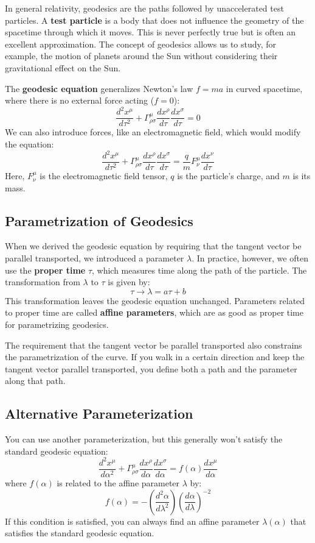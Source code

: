 \documentclass[11pt,letterpaper]{book}
\begin{document}
In general relativity, geodesics are the paths followed by unaccelerated test particles. A \textbf{test particle} is a body that does not influence the geometry of the spacetime through which it moves. This is never perfectly true but is often an excellent approximation. The concept of geodesics allows us to study, for example, the motion of planets around the Sun without considering their gravitational effect on the Sun.

The \textbf{geodesic equation} generalizes Newton's law \( f = ma \) in curved spacetime, where there is no external force acting (\( f = 0 \)):
\[
\frac{d^2 x^\mu}{d\tau^2} + \Gamma^\mu_{\rho\sigma} \frac{dx^\rho}{d\tau} \frac{dx^\sigma}{d\tau} = 0
\]
We can also introduce forces, like an electromagnetic field, which would modify the equation:
\[
\frac{d^2 x^\mu}{d\tau^2} + \Gamma^\mu_{\rho\sigma} \frac{dx^\rho}{d\tau} \frac{dx^\sigma}{d\tau} = \frac{q}{m} F^\mu_{\nu} \frac{dx^\nu}{d\tau}
\]
Here, \( F^\mu_{\nu} \) is the electromagnetic field tensor, \( q \) is the particle's charge, and \( m \) is its mass.

\subsection{Parametrization of Geodesics}

When we derived the geodesic equation by requiring that the tangent vector be parallel transported, we introduced a parameter \( \lambda \). In practice, however, we often use the \textbf{proper time} \( \tau \), which measures time along the path of the particle. The transformation from \( \lambda \) to \( \tau \) is given by:
\[
\tau \to \lambda = a\tau + b
\]
This transformation leaves the geodesic equation unchanged. Parameters related to proper time are called \textbf{affine parameters}, which are as good as proper time for parametrizing geodesics.

The requirement that the tangent vector be parallel transported also constrains the parametrization of the curve. If you walk in a certain direction and keep the tangent vector parallel transported, you define both a path and the parameter along that path.

\subsection{Alternative Parameterization}

You can use another parameterization, but this generally won’t satisfy the standard geodesic equation:
\[
\frac{d^2 x^\mu}{d\alpha^2} + \Gamma^\mu_{\rho\sigma} \frac{dx^\rho}{d\alpha} \frac{dx^\sigma}{d\alpha} = f(\alpha) \frac{dx^\mu}{d\alpha}
\]
where \( f(\alpha) \) is related to the affine parameter \( \lambda \) by:
\[
f(\alpha) = -\left( \frac{d^2 \alpha}{d\lambda^2} \right) \left( \frac{d\alpha}{d\lambda} \right)^{-2}
\]
If this condition is satisfied, you can always find an affine parameter \( \lambda(\alpha) \) that satisfies the standard geodesic equation.
\end{document}
